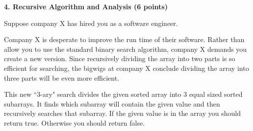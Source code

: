 \documentclass[12pt]{elsart}
\begin{document}
{\bf 4. Recursive Algorithm and Analysis (6 points)}

Suppose company X has hired you as a software engineer.  

Company X is desperate to improve the run time of their software.  Rather than allow you to use the standard binary search algorithm, company X demands you create a new version.  Since recursively dividing the array into two parts is so efficient for searching, the bigwigs at company X conclude dividing the array into three parts will be even more efficient.

This new ``$3$-ary" search divides the given sorted array into 3 equal sized sorted subarrays.  It finds which subarray will contain the given value and then recursively searches that subarray.  If the given value is in the array you should return true.  Otherwise you should return false.
\newpage
\end{document}

